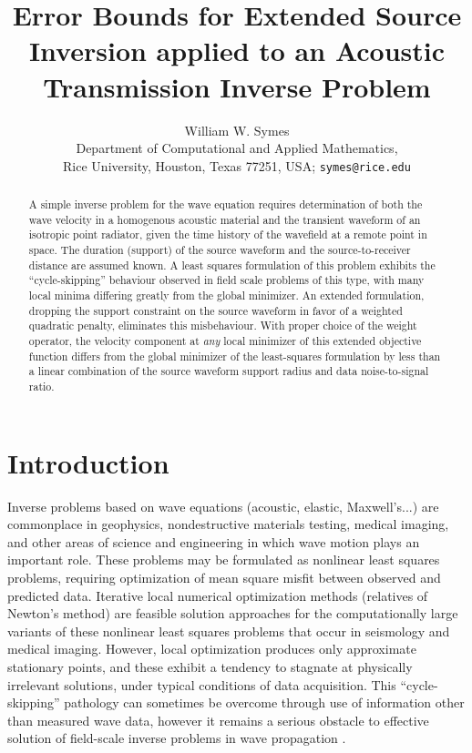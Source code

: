 \title{Error Bounds for Extended Source Inversion applied to an Acoustic Transmission Inverse Problem}
\author{William W. Symes\\
  Department of Computational and Applied Mathematics, \\
  Rice University, Houston, Texas 77251, USA; {\tt symes@rice.edu}}


\begin{abstract}
  A simple inverse problem for the wave equation requires
  determination of both the wave velocity in a homogenous acoustic
  material and the transient waveform of an isotropic point radiator,
  given the time history of the wavefield at a remote point in
  space. The duration (support) of the source waveform and the
  source-to-receiver distance are assumed known. A least squares
  formulation of this problem exhibits the ``cycle-skipping''
  behaviour observed in field scale problems of this type, with many
  local minima differing greatly from the global minimizer. An
  extended formulation, dropping the support constraint on the source
  waveform in favor of a weighted quadratic penalty, eliminates this
  misbehaviour. With proper choice of the weight operator, the
  velocity component at {\em any} local minimizer of this extended
  objective function differs from the global
  minimizer of the least-squares formulation by less than a linear
  combination of the source waveform support radius and data
  noise-to-signal ratio.

\end{abstract}

\section{Introduction}
Inverse problems based on wave equations (acoustic, elastic,
Maxwell's...) are commonplace in geophysics, nondestructive materials
testing, medical imaging, and other areas of science and engineering
in which wave motion plays an important role. These problems may be
formulated as nonlinear least squares problems, requiring optimization
of mean square misfit between observed and predicted data. Iterative
local numerical optimization methods (relatives of Newton's method)
are feasible solution approaches for the computationally large
variants of these nonlinear least squares problems that occur in
seismology and medical imaging. However, local optimization produces
only approximate stationary points, and these exhibit a tendency to
stagnate at physically irrelevant solutions, under typical conditions
of data acquisition. This ``cycle-skipping''
pathology can sometimes be overcome through use of information other than
measured wave data, however it remains a serious obstacle to effective
solution of field-scale inverse problems in wave propagation
\cite[]{GauTarVir:86,VirieuxOperto:09,Fichtner:10,Plessix:10,Schuster:17}.

